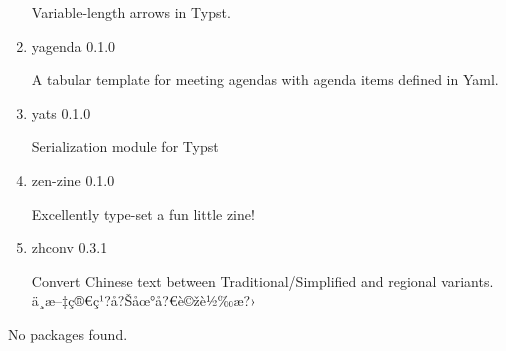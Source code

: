 \begin{enumerate}
  Variable-length arrows in Typst.
\item
  \href{/universe/package/yagenda/}{}


  { yagenda } { 0.1.0 }

  A tabular template for meeting agendas with agenda items defined in
  Yaml.
\item
  \href{/universe/package/yats/}{}

  { yats } { 0.1.0 }

  Serialization module for Typst
\item
  \href{/universe/package/zen-zine/}{}


  { zen-zine } { 0.1.0 }

  Excellently type-set a fun little zine!
\item
  \href{/universe/package/zhconv/}{}

  { zhconv } { 0.3.1 }

  Convert Chinese text between Traditional/Simplified and regional
  variants. ä¸­æ--‡ç®€ç¹?å?Šåœ°å?€è©žè½‰æ?›
\end{enumerate}

No packages found.

